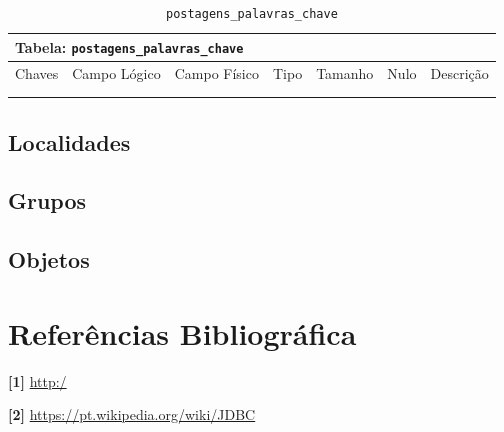 \documentclass[12pt,a4paper]{article}
\begin{document}
\begin{center}
\begin{table}[h!]
	\caption{\texttt{postagens\_palavras\_chave}}
	\label{tabela:postagensPalavrasChave}
	\begin{tabular}{|p{1cm}|p{1.5cm}|p{1.25cm}|p{1.25cm}|p{1.75cm}|p{1.25cm}|p{4.5cm}|}\hline	
		\multicolumn{7}{|p{16cm}|}{\cellcolor{cinzaClaro}  \centering Tabela: \texttt{postagens\_palavras\_chave}} \\ \hline %
		{\small Chaves} & {\small Campo Lógico} & {\small Campo Físico} & {\small Tipo} & {\small Tamanho} & {\small Nulo} & {\small Descrição}\\\hline %
		
		{\tiny } & {\tiny } & {\tiny } & {\tiny } & {\tiny } & {\tiny } &{\tiny }\\\hline
		{\tiny } & {\tiny } & {\tiny } & {\tiny } & {\tiny } & {\tiny } &{\tiny }\\\hline
		
			
	\end{tabular}
\end{table}	
\end{center}








\subsection{Localidades}


\subsection{Grupos}


\subsection{Objetos}



\section{Referências Bibliográfica}
\noindent \textbf{[1]} \url {http:/}\\\vspace{0.2cm}

\noindent \textbf{[2] }\url{https://pt.wikipedia.org/wiki/JDBC}\\\vspace{0.2cm}
\end{document}
